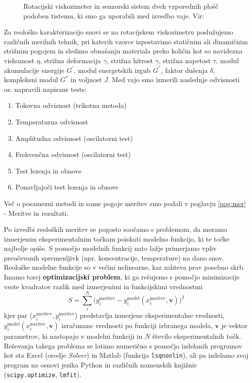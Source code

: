 \documentclass{article}
\begin{document}
\begin{figure}
   \caption{Rotacijski viskozimeter in senzorski sistem dveh vzporednih plošč podoben tistemu, ki smo ga uporabili med izvedbo vaje. Vir: }
   \label{fig:viskozimeter}
\end{figure}

Za reološko karakterizacijo snovi se na rotacijskem viskozimetru poslužujemo različnih merilnih tehnik, pri katerih vzorce izpostavimo statičnim ali dinamičnim strižnim pogojem in sledimo obnašanju materiala preko količin kot so navidezna viskoznost $\eta$, strižna deformacija $\gamma$, strižna hitrost $\dot{\gamma}$, strižna napetost $\tau$, modul akumulacije energije $G^{'}$, modul energetskih izgub $G^{''}$, faktor dušenja $\delta$, kompleksni modul $G^*$ in voljnost $J$. Med vajo smo izmerili naslednje odvisnosti oz. napravili napisane teste:
\begin{enumerate}
\item Tokovna odvisnost (trikotna metoda)
\item Temperaturna odvisnost
\item Amplitudna odvisnost (oscilatorni test)
\item Frekvenčna odvisnost (oscilatorni test)
\item Test lezenja in obnove
\item Ponavljajoči test lezenja in obnove
\end{enumerate}
Več o posamezni metodi in same pogoje meritev smo podali v poglavju \ref{pog:mer} - Meritve in rezultati.

Po izvedbi reoloških meritev se pogosto soočamo s problemom, da moramo izmerjenim eksperimentalnim točkam poiskati modelno funkcijo, ki te točke najbolje opiše. S pomočjo modelnih funkcij nato lažje primerjamo vpliv preučevanih spremenljivk (npr. koncentracije, temperature) na dano snov. Reološke modelne funkcije so v večini nelinearne, kar zahteva prav posebno skrb. Imamo torej \textbf{optimizacijski problem}, ki ga rešujemo s pomočjo minimizacije vsote kvadratov razlik med izmerjenimi in funkcijskimi vrednostmi
\begin{equation}
S = \sum\limits^N_i \big(y^\mathrm{meritev}_i-y^\mathrm{model}_i(x^\mathrm{meritev}_i,\mathrm{\textbf{v}})\big)^2
\end{equation}
kjer par ($x^\mathrm{meritev}_i,y^\mathrm{meritev}_i$) predstavlja izmerjene eksperimentalne vrednosti, $y^\mathrm{model}_i(x^\mathrm{meritev}_i,\mathrm{\textbf{v}})$ izračunane vrednosti po funkciji izbranega modela, $\mathrm{\textbf{v}}$ je vektor parametrov, ki nastopajo v modelni funkciji in $N$ število eksperimentalnih točk. Reševanja takega problema se lotimo numerično s pomočjo izdelanih programov kot sta Excel (orodje \textit{Solver}) in Matlab (funkcija \texttt{lsqnonlin}), ali pa izdelamo svoj program na osnovi jezika Python in različnih namenskih knjižnic (\texttt{scipy.optimize}, \texttt{lmfit}).
\end{document}
